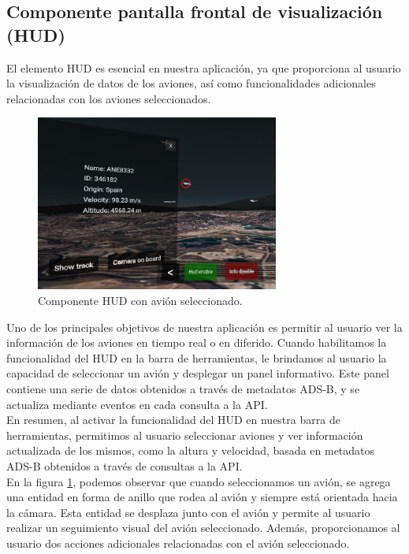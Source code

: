 \documentclass[a4paper, 11pt]{book}
\begin{document}
\subsection{Componente pantalla frontal de visualización (HUD)}
\label{subsec:hud}
El elemento \textsc{HUD} es esencial en nuestra aplicación, ya que proporciona al usuario la visualización de datos de los aviones, así como funcionalidades adicionales relacionadas con los aviones seleccionados.
\begin{figure}[h]
  \centering
  \includegraphics[width=8cm, keepaspectratio]{img/hud.jpg}
  \caption{Componente \textsc{HUD} con avión seleccionado.}
  \label{fig:hud}
\end{figure}

Uno de los principales objetivos de nuestra aplicación es permitir al usuario ver la información de los aviones en tiempo real o en diferido. Cuando habilitamos la funcionalidad del \textsc{HUD} en la barra de herramientas, le brindamos al usuario la capacidad de seleccionar un avión y desplegar un panel informativo. Este panel contiene una serie de datos obtenidos a través de metadatos \textsc{ADS-B}, y se actualiza mediante eventos en cada consulta a la \textsc{API}.\\
En resumen, al activar la funcionalidad del \textsc{HUD} en nuestra barra de herramientas, permitimos al usuario seleccionar aviones y ver información actualizada de los mismos, como la altura y velocidad, basada en metadatos \textsc{ADS-B} obtenidos a través de consultas a la \textsc{API}.\\
En la figura \ref{fig:hud}, podemos observar que cuando seleccionamos un avión, se agrega una entidad en forma de anillo que rodea al avión y siempre está orientada hacia la cámara. Esta entidad se desplaza junto con el avión y permite al usuario realizar un seguimiento visual del avión seleccionado. Además, proporcionamos al usuario dos acciones adicionales relacionadas con el avión seleccionado.
\end{document}
